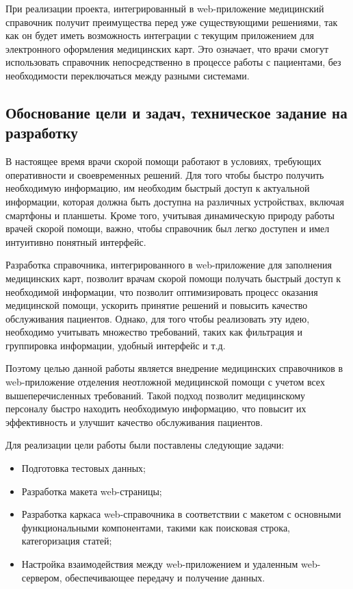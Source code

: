 При реализации проекта, интегрированный в web-приложение медицинский справочник получит преимущества перед уже существующими решениями, так как он будет иметь возможность интеграции с текущим приложением для электронного оформления медицинских карт. Это означает, что врачи смогут использовать справочник непосредственно в процессе работы с пациентами, без необходимости переключаться между разными системами. 

\subsection{Обоснование цели и задач, техническое задание на разработку}
В настоящее время врачи скорой помощи работают в условиях, требующих оперативности и своевременных решений. Для того чтобы быстро получить необходимую информацию, им необходим быстрый доступ к актуальной информации, которая должна быть доступна на различных устройствах, включая смартфоны и планшеты. Кроме того, учитывая динамическую природу работы врачей скорой помощи, важно, чтобы справочник был легко доступен и имел интуитивно понятный интерфейс.

Разработка справочника, интегрированного в web-приложение для заполнения медицинских карт, позволит врачам скорой помощи получать быстрый доступ к необходимой информации, что позволит оптимизировать процесс оказания медицинской помощи, ускорить принятие решений и повысить качество обслуживания пациентов. Однако, для того чтобы реализовать эту идею, необходимо учитывать множество требований, таких как фильтрация и группировка информации, удобный интерфейс и т.д.

Поэтому целью данной работы является внедрение медицинских справочников в web-приложение отделения неотложной медицинской помощи с учетом всех вышеперечисленных требований. Такой подход позволит медицинскому персоналу быстро находить необходимую информацию, что повысит их эффективность и улучшит качество обслуживания пациентов.

Для реализации цели работы были поставлены следующие задачи:
\begin{itemize}
    \item Подготовка тестовых данных;
    \item Разработка макета web-страницы;
    \item Разработка каркаса web-справочника в соответствии с макетом с основными функциональными компонентами, такими как поисковая строка, категоризация статей;
    \item Настройка взаимодействия между web-приложением и удаленным web-сервером, обеспечивающее передачу и получение данных.
\end{itemize}

